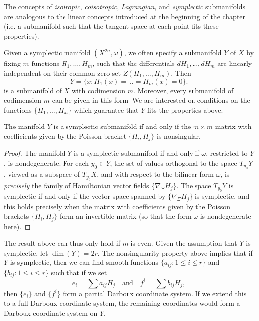 The concepts of \emph{isotropic}, \emph{coisotropic}, \emph{Lagrangian}, and \emph{symplectic} submanifolds are analogous to the linear concepts introduced at the beginning of the chapter (i.e. a submanifold such that the tangent space at each point fits these properties).

Given a symplectic manifold $(X^{2n},\omega)$, we often specify a submanifold $Y$ of $X$ by fixing $m$ functions $H_1,\dots,H_m$, such that the differentials $dH_1,\dots,dH_m$ are linearly independent on their common zero set $Z(H_1,\dots,H_m)$. Then
%
\[ Y = \{ x: H_1(x) = \dots = H_m(x) = 0 \}. \]
%
is a submanifold of $X$ with codimension $m$. Moreover, every submanifold of codimension $m$ can be given in this form. We are interested on conditions on the functions $\{ H_1,\dots, H_m \}$ which guarantee that $Y$ fits the properties above.

\begin{theorem}
    The manifold $Y$ is a symplectic submanifold if and only if the $m \times m$ matrix with coefficients given by the Poisson bracket $\{ H_i, H_j \}$ is nonsingular.
\end{theorem}
\begin{proof}
    The manifold $Y$ is a symplectic submanifold if and only if $\omega$, restricted to $Y$, is nondegenerate. For each $y_0 \in Y$, the set of values orthogonal to the space $T_{y_0} Y$, viewed as a subspace of $T_{y_0} X$, and with respect to the bilinear form $\omega$, is \emph{precisely} the family of Hamiltonian vector fields $\{ \nabla_\Xi H_j \}$. The space $T_{y_0} Y$ is symplectic if and only if the vector space spanned by $\{ \nabla_\Xi H_j \}$ is symplectic, and this holds precisely when the matrix with coefficients given by the Poisson brackets $\{ H_i, H_j \}$ form an invertible matrix (so that the form $\omega$ is nondegenerate here).
\end{proof}

\begin{remark}
    The result above can thus only hold if $m$ is even. Given the assumption that $Y$ is symplectic, let $\dim(Y) = 2r$. The nonsingularity property above implies that if $Y$ is symplectic, then we can find smooth functions $\{ a_{ij} : 1 \leq i \leq r \}$ and $\{ b_{ij} : 1 \leq i \leq r \}$ such that if we set
    \[ e_i = \sum a_{ij} H_j \quad\text{and}\quad f^i = \sum b_{ij} H_j, \]
    then $\{ e_i \}$ and $\{ f^i \}$ form a partial Darboux coordinate system. If we extend this to a full Darboux coordinate system, the remaining coordinates would form a Darboux coordinate system on $Y$.
\end{remark}


